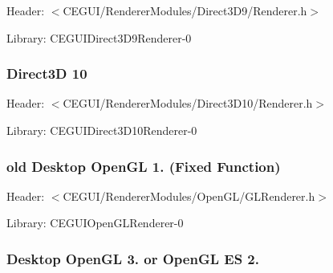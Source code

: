 \begin{DoxyItemize}
\item Header\+: $<$C\+E\+G\+U\+I/\+Renderer\+Modules/\+Direct3\+D9/\+Renderer.\+h$>$
\item Library\+: C\+E\+G\+U\+I\+Direct3\+D9\+Renderer-\/0 
\begin{DoxyCode}{0}
\end{DoxyCode}

\end{DoxyItemize}\hypertarget{rendering_tutorial_rendering_tutorial_renderer_d3d10}{}\subsubsection{Direct3\+D 10}\label{rendering_tutorial_rendering_tutorial_renderer_d3d10}

\begin{DoxyItemize}
\item Header\+: $<$C\+E\+G\+U\+I/\+Renderer\+Modules/\+Direct3\+D10/\+Renderer.\+h$>$
\item Library\+: C\+E\+G\+U\+I\+Direct3\+D10\+Renderer-\/0 
\begin{DoxyCode}{0}
\end{DoxyCode}

\end{DoxyItemize}\hypertarget{rendering_tutorial_rendering_tutorial_renderer_ogl}{}\subsubsection{old Desktop Open\+G\+L 1. (\+Fixed Function)}\label{rendering_tutorial_rendering_tutorial_renderer_ogl}

\begin{DoxyItemize}
\item Header\+: $<$C\+E\+G\+U\+I/\+Renderer\+Modules/\+Open\+G\+L/\+G\+L\+Renderer.\+h$>$
\item Library\+: C\+E\+G\+U\+I\+Open\+G\+L\+Renderer-\/0 
\begin{DoxyCode}{0}
\DoxyCodeLine{\textcolor{comment}{// Create an OpenGLRenderer object that uses the current GL viewport as}}
\DoxyCodeLine{\textcolor{comment}{// the default output surface.}}
\end{DoxyCode}

\end{DoxyItemize}\hypertarget{rendering_tutorial_rendering_tutorial_renderer_ogl3}{}\subsubsection{Desktop Open\+G\+L 3. or Open\+G\+L E\+S 2.}\label{rendering_tutorial_rendering_tutorial_renderer_ogl3}


